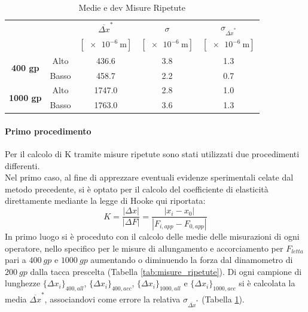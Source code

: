 \documentclass[a4paper,11pt,oneside]{article}
\begin{document}
\begin{table}[h!]
    \centering
    \begin{tabular}{|c|c|c|c|c|}
        \hline
          \multicolumn{2}{|c|}{\multirow{2}{*}{}} & ${\overline{\Delta x}}^\ast$& $\sigma$ & $\sigma_{{\overline{\Delta x}}^\ast}$\\
          \multicolumn{2}{|c|}{} & $[\SI{e-6}{\meter}]$ & $[\SI{e-6}{\meter}]$ & $[\SI{e-6}{\meter}]$\\ 
          \hline
          \multirow{2}{*}{\textbf{400 gp}}& {\cellcolor[rgb]{0.85,0.85,0.85}}Alto & {\cellcolor[rgb]{0.85,0.85,0.85}}436.6&	{\cellcolor[rgb]{0.85,0.85,0.85}}3.8&	{\cellcolor[rgb]{0.85,0.85,0.85}}1.3\\ \cline{2-5}
          &Basso&   458.7&	2.2&	0.7\\
          \hline
          \multirow{2}{*}{\textbf{1000 gp}}& {\cellcolor[rgb]{0.85,0.85,0.85}}Alto & {\cellcolor[rgb]{0.85,0.85,0.85}}1747.0&	{\cellcolor[rgb]{0.85,0.85,0.85}}2.8&	{\cellcolor[rgb]{0.85,0.85,0.85}}1.0\\ \cline{2-5}
          &Basso&   1763.0&	3.6&	1.3\\
         \hline
    \end{tabular}
    \caption{Medie e dev Misure Ripetute}
    \label{tab:medie_misure_ripetute}
\end{table}{}
\paragraph{Primo procedimento}
Per il calcolo di K tramite misure ripetute sono stati utilizzati due procedimenti differenti.\\
Nel primo caso, al fine di apprezzare eventuali evidenze sperimentali celate dal metodo precedente, si è optato per il calcolo del coefficiente di elasticità direttamente mediante la legge di Hooke qui riportata:\\%
\begin{equation*}
    K=\frac{\left | \Delta x \right |}{\left | \Delta F \right |}=\frac{\left | x_{i}-x_{0} \right |}{\left | F_{i, app}- F_{0, app} \right |}
\end{equation*}
In primo luogo si è proceduto con il calcolo delle medie delle misurazioni di ogni operatore, nello specifico per le misure di allungamento e accorciamento per $F_{letta}$ pari a $\SI{400}{gp}$ e $\SI{1000}{gp}$ aumentando o diminuendo la forza dal dinamometro di $\SI{200}{gp}$ dalla tacca prescelta (Tabella \ref{tab:misure_ripetute}). Di ogni campione di lunghezze $\{ {\Delta x}_i \}_{400, all}$, $\{ {\Delta x}_i \}_{400, acc}$, $\{ {\Delta x}_i \}_{1000, all}$ e $\{ {\Delta x}_i \}_{1000, acc}$ si è calcolata la media ${\overline{\Delta x}}^\ast$, associandovi come errore la relativa $\sigma_{\overline{\Delta x}^\ast}$ (Tabella \ref{tab:medie_misure_ripetute}).\\
\end{document}
